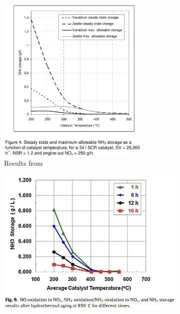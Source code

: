 \begin{figure}[H]
    \begin{minipage}{0.49\textwidth}
        \begin{figure}[H]
            \includegraphics[width = 0.8\textwidth]{./figs/storage_capacity/sae.png}
            \caption*{Results from \cite{willems2007closed}}
        \end{figure}
    \end{minipage}
    \begin{minipage}{0.49\textwidth}
        \begin{figure}[H]
            \includegraphics[width = \textwidth]{./figs/storage_capacity/th1.png}

\end{figure}
\end{minipage}
\end{figure}
